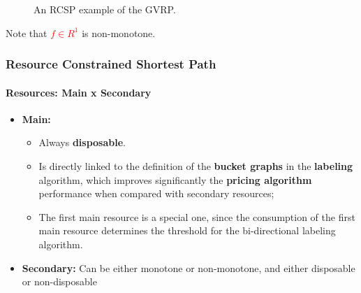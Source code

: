 \begin{frame}
\begin{multicols}{2}
\begin{figure}[H]
      \caption{An RCSP example of the GVRP.}
      \label{fig:gvrp_disposable_example}
    \end{figure}
    Note that \textcolor{red}{$f \in R^1$} is non-monotone.
  \end{multicols}
\end{frame}

\begin{frame}
  \frametitle{Resource Constrained Shortest Path}
  \framesubtitle{Resources: Main x Secondary}
  \begin{itemize}
    \item \textbf{Main:} 
      \begin{itemize}
        \item Always \textbf{disposable}.
        \item Is directly linked to the definition of the \textbf{bucket graphs} in the \textbf{labeling} algorithm, which improves significantly the \textbf{pricing algorithm} performance when compared with secondary resources;
        \item The first main resource is a special one, since the consumption of the first main resource determines the threshold for the bi-directional labeling algorithm.
      \end{itemize}
    \item \textbf{Secondary:} Can be either monotone or non-monotone, and either disposable or non-disposable
  \end{itemize}
\end{frame}

